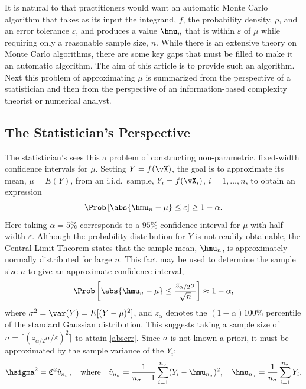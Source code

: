 \documentclass[graybox]{svmult}
\newcommand{\hv}{\hat{v}}
\newcommand{\fudge}{\mathfrak{C}}
\begin{document}
It is natural to that practitioners would want an automatic Monte Carlo algorithm that takes as its input the integrand, $f$, the probability density, $\rho$, and an error tolerance $\varepsilon$, and produces a value $\hmu_n$ that is within $\varepsilon$ of $\mu$ while requiring only a reasonable sample size, $n$.  While there is an extensive theory on Monte Carlo algorithms, there are some key gaps that must be filled to make it an automatic algorithm.  The aim of this article is to provide such an algorithm.  Next this problem of approximating $\mu$ is summarized from the perspective of a statistician and then from the perspective of an information-based complexity theorist or numerical analyst.

\subsection{The Statistician's Perspective} \label{statperspsec}  
The statistician's sees this a problem of constructing non-parametric, fixed-width confidence intervals for $\mu$.  Setting $Y=f(\vX)$, the goal is to approximate its mean, $\mu=E(Y)$, from an i.i.d.\ sample, $Y_i=f(\vX_i)$, $i=1, \ldots, n$, to obtain an expression
\begin{equation} \label{abserr}
\Prob\left[\abs{\hmu_n-\mu} \le \varepsilon \right] \geq 1-\alpha.
\end{equation}
Here taking $\alpha=5\%$ corresponds to a $95\%$ confidence interval for $\mu$ with half-width $\varepsilon$.  Although the probability distribution for $Y$ is not readily obtainable, the Central Limit Theorem states that the sample mean, $\hmu_n$, is approximately normally distributed for large $n$.  This fact may be used to determine the sample size $n$ to give an approximate confidence interval, 
\begin{equation} \label{CLT}
\Prob\left[\abs{\hmu_n-\mu} \le \frac{z_{\alpha/2} \sigma} {\sqrt{n}} \right] \approx 1-\alpha,
\end{equation}
where $\sigma^2 = \var(Y)=E[(Y-\mu)^2]$, and $z_\alpha$ denotes the $(1-\alpha)100\%$ percentile of the standard Gaussian distribution.  This suggests taking a sample size of $n=\lceil (z_{\alpha/2}\sigma/\varepsilon)^2\rceil$ to attain \eqref{abserr}.  Since $\sigma$ is not known a priori, it must be approximated by the sample variance of the $Y_i$:
\begin{equation} \label{samplevar}
\hsigma^2 = \fudge^2 \hv_{n_{\sigma}}, \quad \text{where} \quad \hv_{n_{\sigma}} = \frac 1{n_{\sigma}-1} \sum_{i=1}^{n_{\sigma}} (Y_i- \hmu_{n_{\sigma}})^2, \quad \hmu_{n_{\sigma}} = \frac 1{n_{\sigma}} \sum_{i=1}^{n_{\sigma}} Y_i.
\end{equation}
\end{document}
